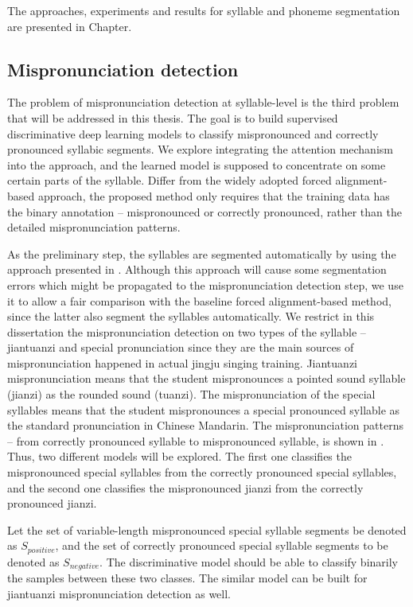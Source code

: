 The approaches, experiments and results for syllable and phoneme segmentation are presented in Chapter.

\subsection{Mispronunciation detection}\label{sec:ch3:mispronunciation}

The problem of mispronunciation detection at syllable-level is the third problem that will be addressed in this thesis. The goal is to build supervised discriminative deep learning models to classify mispronounced and correctly pronounced syllabic segments. We explore integrating the attention mechanism into the approach, and the learned model is supposed to concentrate on some certain parts of the syllable. Differ from the widely adopted forced alignment-based approach, the proposed method only requires that the training data has the binary annotation -- mispronounced or correctly pronounced, rather than the detailed mispronunciation patterns.

As the preliminary step, the syllables are segmented automatically by using the approach presented in . Although this approach will cause some segmentation errors which might be propagated to the mispronunciation detection step, we use it to allow a fair comparison with the baseline forced alignment-based method, since the latter also segment the syllables automatically. We restrict in this dissertation the mispronunciation detection on two types of the syllable -- jiantuanzi and special pronunciation since they are the main sources of mispronunciation happened in actual jingju singing training. Jiantuanzi mispronunciation means that the student mispronounces a pointed sound syllable (jianzi) as the rounded sound (tuanzi). The mispronunciation of the special syllables means that the student mispronounces a special pronounced syllable as the standard pronunciation in Chinese Mandarin. The mispronunciation patterns -- from correctly pronounced syllable to mispronounced syllable, is shown in . Thus, two different models will be explored. The first one classifies the mispronounced special syllables from the correctly pronounced special syllables, and the second one classifies the mispronounced jianzi from the correctly pronounced jianzi.

Let the set of variable-length mispronounced special syllable segments be denoted as $S_{positive}$, and the set of correctly pronounced special syllable segments to be denoted as $S_{negative}$. The discriminative model should be able to classify binarily the samples between these two classes. The similar model can be built for jiantuanzi mispronunciation detection as well. 

